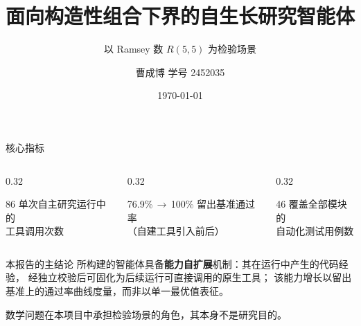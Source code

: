 \documentclass[aspectratio=169,11pt]{beamer}
\title[自生长研究智能体]{面向构造性组合下界的自生长研究智能体}
\subtitle{以 Ramsey 数 $R(5,5)$ 为检验场景}
\author[曹成博]{曹成博 \quad 学号 2452035}
\institute{人工智能选修课\\课程项目报告}
\date{\today}
\begin{document}
\begin{frame}
  \titlepage
\end{frame}

\begin{frame}{核心指标}
  \begin{columns}[T,onlytextwidth]
    \begin{column}{0.32\textwidth}
      \begin{block}{86}
        \centering
        单次自主研究运行中的\\工具调用次数
      \end{block}
    \end{column}
    \begin{column}{0.32\textwidth}
      \begin{block}{76.9\%\,$\rightarrow$\,100\%}
        \centering
        留出基准通过率\\（自建工具引入前后）
      \end{block}
    \end{column}
    \begin{column}{0.32\textwidth}
      \begin{block}{46}
        \centering
        覆盖全部模块的\\自动化测试用例数
      \end{block}
    \end{column}
  \end{columns}

  \vspace{0.6em}
  \begin{block}{本报告的主结论}
    所构建的智能体具备\textbf{能力自扩展}机制：其在运行中产生的代码经验，
    经独立校验后可固化为后续运行可直接调用的原生工具；
    该能力增长以留出基准上的通过率曲线度量，而非以单一最优值表征。

    \vspace{0.3em}
    \small\color{black!65}
    数学问题在本项目中承担检验场景的角色，其本身不是研究目的。
  \end{block}
\end{frame}
\end{document}
